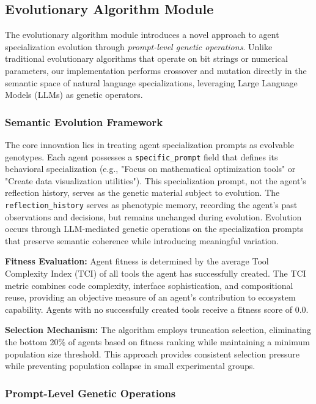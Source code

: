 \subsection{Evolutionary Algorithm Module}

The evolutionary algorithm module introduces a novel approach to agent specialization evolution through \textit{prompt-level genetic operations}. Unlike traditional evolutionary algorithms that operate on bit strings or numerical parameters, our implementation performs crossover and mutation directly in the semantic space of natural language specializations, leveraging Large Language Models (LLMs) as genetic operators.

\subsubsection{Semantic Evolution Framework}

The core innovation lies in treating agent specialization prompts as evolvable genotypes. Each agent possesses a \texttt{specific\_prompt} field that defines its behavioral specialization (e.g., "Focus on mathematical optimization tools" or "Create data visualization utilities"). This specialization prompt, not the agent's reflection history, serves as the genetic material subject to evolution. The \texttt{reflection\_history} serves as phenotypic memory, recording the agent's past observations and decisions, but remains unchanged during evolution. Evolution occurs through LLM-mediated genetic operations on the specialization prompts that preserve semantic coherence while introducing meaningful variation.

\textbf{Fitness Evaluation:} Agent fitness is determined by the average Tool Complexity Index (TCI) of all tools the agent has successfully created. The TCI metric combines code complexity, interface sophistication, and compositional reuse, providing an objective measure of an agent's contribution to ecosystem capability. Agents with no successfully created tools receive a fitness score of 0.0.

\textbf{Selection Mechanism:} The algorithm employs truncation selection, eliminating the bottom 20\% of agents based on fitness ranking while maintaining a minimum population size threshold. This approach provides consistent selection pressure while preventing population collapse in small experimental groups.

\subsubsection{Prompt-Level Genetic Operations}

